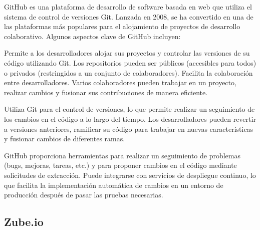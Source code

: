 GitHub es una plataforma de desarrollo de software basada en web que utiliza el sistema de control de versiones Git. Lanzada en 2008, se ha convertido en una de las plataformas más populares para el alojamiento de proyectos de desarrollo colaborativo. Algunos aspectos clave de GitHub incluyen:

Permite a los desarrolladores alojar sus proyectos y controlar las versiones de su código utilizando Git. Los repositorios pueden ser públicos (accesibles para todos) o privados (restringidos a un conjunto de colaboradores). Facilita la colaboración entre desarrolladores. Varios colaboradores pueden trabajar en un proyecto, realizar cambios y fusionar sus contribuciones de manera eficiente.

Utiliza Git para el control de versiones, lo que permite realizar un seguimiento de los cambios en el código a lo largo del tiempo. Los desarrolladores pueden revertir a versiones anteriores, ramificar su código para trabajar en nuevas características y fusionar cambios de diferentes ramas.

GitHub proporciona herramientas para realizar un seguimiento de problemas (bugs, mejoras, tareas, etc.) y para proponer cambios en el código mediante solicitudes de extracción. Puede integrarse con servicios de despliegue continuo, lo que facilita la implementación automática de cambios en un entorno de producción después de pasar las pruebas necesarias.

\subsection{Zube.io}

